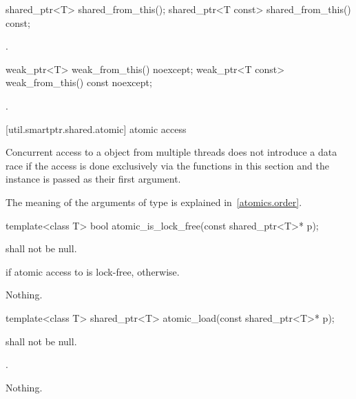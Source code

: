 %
%
\begin{itemdecl}
shared_ptr<T>       shared_from_this();
shared_ptr<T const> shared_from_this() const;
\end{itemdecl}

\begin{itemdescr}
\pnum\returns  {}.
\end{itemdescr}

%
%
\begin{itemdecl}
weak_ptr<T>       weak_from_this() noexcept;
weak_ptr<T const> weak_from_this() const noexcept;
\end{itemdecl}

\begin{itemdescr}
\pnum\returns  {}.
\end{itemdescr}

[util.smartptr.shared.atomic]{ atomic access}

\pnum
Concurrent access to a  object from multiple threads does not
introduce a data race if the access is done exclusively via the functions in
this section and the instance is passed as their first argument.

\pnum
The meaning of the arguments of type  is explained in~\ref{atomics.order}.

%
\begin{itemdecl}
template<class T>
  bool atomic_is_lock_free(const shared_ptr<T>* p);
\end{itemdecl}

\begin{itemdescr}
\pnum
\requires {} shall not be null.

\pnum
\returns {} if atomic access to  is lock-free,  otherwise.

\pnum
\throws Nothing.
\end{itemdescr}

%
\begin{itemdecl}
template<class T>
  shared_ptr<T> atomic_load(const shared_ptr<T>* p);
\end{itemdecl}

\begin{itemdescr}
\pnum
\requires {} shall not be null.

\pnum
\returns {}.

\pnum
\throws Nothing.
\end{itemdescr}

